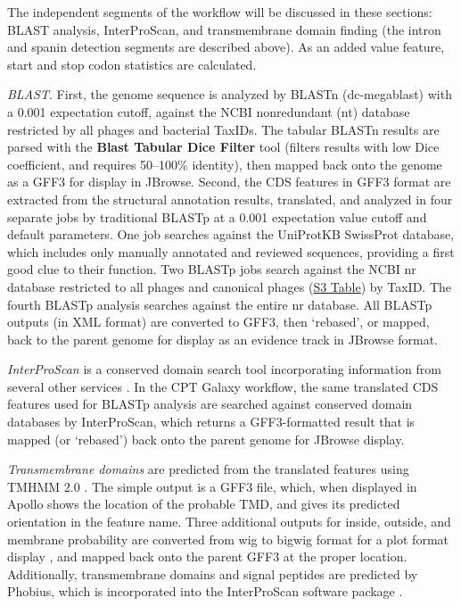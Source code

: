 The independent segments of the workflow will be discussed in these
sections: BLAST analysis, InterProScan, and transmembrane domain finding
(the intron and spanin detection segments are described above). As an
added value feature, start and stop codon statistics are calculated.

\emph{BLAST}. First, the genome sequence is analyzed by BLASTn
(dc-megablast) with a 0.001 expectation cutoff, against the NCBI
nonredundant (nt) database restricted by all phages and bacterial
TaxIDs. The tabular BLASTn results are parsed with the \textbf{Blast
Tabular Dice Filter} tool (filters results with low Dice coefficient,
and requires 50--100\% identity), then mapped back onto the genome as a
GFF3 for display in JBrowse. Second, the CDS features in GFF3 format are
extracted from the structural annotation results, translated, and
analyzed in four separate jobs by traditional BLASTp at a 0.001
expectation value cutoff and default parameters. One job searches
against the UniProtKB SwissProt database, which includes only manually
annotated and reviewed sequences, providing a first good clue to their
function. Two BLASTp jobs search against the NCBI nr database restricted
to all phages and canonical phages
(\protect\hyperlink{pcbi.1008214.s003}{S3 Table}) by TaxID. The fourth
BLASTp analysis searches against the entire nr database. All BLASTp
outputs (in XML format) are converted to GFF3, then `rebased', or
mapped, back to the parent genome for display as an evidence track in
JBrowse format.

\emph{InterProScan} is a conserved domain search tool incorporating
information from several other services \cite{Quevillon_2005,Zdobnov_2001,Hunter_2009,Jones_2014}. In the CPT Galaxy
workflow, the same translated CDS features used for BLASTp analysis are
searched against conserved domain databases by InterProScan, which
returns a GFF3-formatted result that is mapped (or `rebased') back onto
the parent genome for JBrowse display.

\emph{Transmembrane domains} are predicted from the translated features
using TMHMM 2.0 \cite{Krogh_2001}. The simple output is a GFF3 file, which, when
displayed in Apollo shows the location of the probable TMD, and gives
its predicted orientation in the feature name. Three additional outputs
for inside, outside, and membrane probability are converted from wig to
bigwig format for a plot format display \cite{Kent_2010}, and mapped back onto
the parent GFF3 at the proper location. Additionally, transmembrane
domains and signal peptides are predicted by Phobius, which is
incorporated into the InterProScan software package \cite{Jones_2014,Kent_2010,K_ll_2004}.

